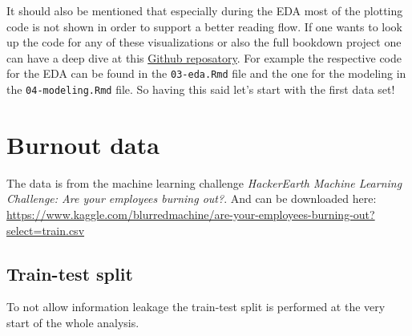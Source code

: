 \documentclass[
]{book}
\newenvironment{Shaded}{\begin{snugshade}}{\end{snugshade}}
\newcommand{\CommentTok}[1]{\textcolor[rgb]{0.56,0.35,0.01}{\textit{#1}}}
\newcommand{\FunctionTok}[1]{\textcolor[rgb]{0.00,0.00,0.00}{#1}}
\newcommand{\NormalTok}[1]{#1}
\newcommand{\OtherTok}[1]{\textcolor[rgb]{0.56,0.35,0.01}{#1}}
\newcommand{\SpecialCharTok}[1]{\textcolor[rgb]{0.00,0.00,0.00}{#1}}
\newcommand{\StringTok}[1]{\textcolor[rgb]{0.31,0.60,0.02}{#1}}
\begin{document}
It should also be mentioned that especially during the EDA most of the plotting code is not shown in order to support a better reading flow. If one wants to look up the code for any of these visualizations or also the full bookdown project one can have a deep dive at this \href{https://github.com/EmanuelSommer/boosting_methods}{Github reposatory}. For example the respective code for the EDA can be found in the \texttt{03-eda.Rmd} file and the one for the modeling in the \texttt{04-modeling.Rmd} file. So having this said let's start with the first data set!

\hypertarget{burnout-data}{%
\section{Burnout data}\label{burnout-data}}

The data is from the machine learning challenge \emph{HackerEarth Machine Learning Challenge: Are your employees burning out?}. And can be downloaded here: \url{https://www.kaggle.com/blurredmachine/are-your-employees-burning-out?select=train.csv}

\begin{Shaded}
\end{Shaded}

\hypertarget{train-test-split}{%
\subsection{Train-test split}\label{train-test-split}}

To not allow information leakage the train-test split is performed at the very start of the whole analysis.
\end{document}
